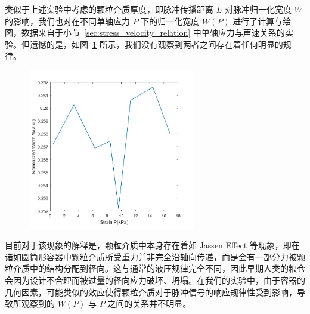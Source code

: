 类似于上述实验中考虑的颗粒介质厚度，即脉冲传播距离 $L$ 对脉冲归一化宽度 $W$ 的影响，我们也对在不同单轴应力 $P$ 下的归一化宽度 $W(P)$ 进行了计算与绘图，数据来自于小节~\ref{sec:stress_velocity_relation} 中单轴应力与声速关系的实验。但遗憾的是，如图~\ref{fig:normalized_width_versus_P} 所示，我们没有观察到两者之间存在着任何明显的规律。

\begin{figure}[!hbtp]
  \centering
  \includegraphics[height=7cm]{figures/2_W_norm&Strain.png}
  \label{fig:normalized_width_versus_P}
\end{figure}

目前对于该现象的解释是，颗粒介质中本身存在着如 Jassen Effect 等现象，即在诸如圆筒形容器中颗粒介质所受重力并非完全沿轴向传递，而是会有一部分力被颗粒介质中的结构分配到径向。这与通常的液压规律完全不同，因此早期人类的粮仓会因为设计不合理而被过量的径向应力破坏、坍塌\cite{sperlExperimentsCornPressure2006}。在我们的实验中，由于容器的几何因素，可能类似的效应使得颗粒介质对于脉冲信号的响应规律性受到影响，导致所观察到的 $W(P)$ 与 $P$ 之间的关系并不明显。